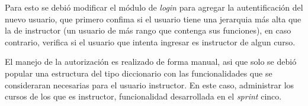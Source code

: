 Para esto se debió modificar el módulo de \emph{login} para agregar la autentificación del nuevo usuario, que primero confima si el usuario tiene una jerarquia más alta que la de instructor (un usuario de más rango que contenga sus funciones), en caso contrario, verifica si el usuario que intenta ingresar es instructor de algun curso.

El manejo de la autorización es realizado de forma manual, asi que solo se debió popular una estructura del tipo diccionario con las funcionalidades que se consideraran necesarias para el usuario instructor. En este caso, administrar los cursos de los que es instructor, funcionalidad desarrollada en el \emph{sprint} cinco.

